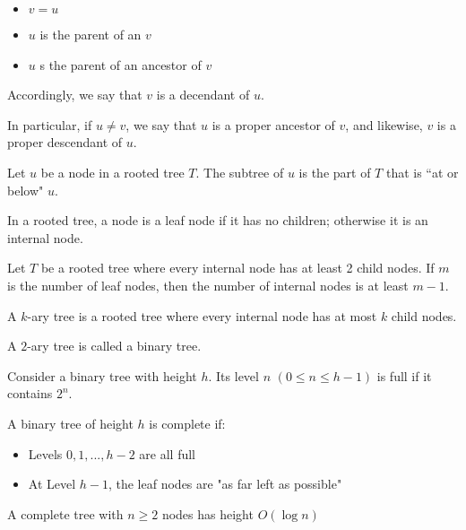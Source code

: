 \documentclass[10pt,a4paper]{article}
\begin{document}
\begin{multicols}{3}
    \begin{itemize}
        \item $v = u$
        \item $u$ is the parent of an $v$
        \item $u$ s the parent of an ancestor of $v$
    \end{itemize}

    Accordingly, we say that $v$ is a decendant of $u$.

    In particular, if $u \neq v$, we say that $u$ is a proper ancestor of $v$, and likewise, $v$ is a proper descendant of $u$.

    Let $u$ be a node in a rooted tree $T$. The subtree of $u$ is the part of $T$ that is ``at or below" $u$.

    In a rooted tree, a node is a leaf node if it has no children; otherwise it is an internal node.

    Let $T$ be a rooted tree where every internal node has at least 2 child nodes. If $m$ is the number of leaf nodes, then the number of internal nodes is at least $m-1$.

    A $k$-ary tree is a rooted tree where every internal node has at most $k$ child nodes.

    A $2$-ary tree is called a binary tree.

    Consider a binary tree with height $h$. Its level $n$ $(0 \leqslant n \leqslant h - 1)$ is full if it contains $2^n$. 

    A binary tree of height $h$ is complete if:

    \begin{itemize}
        \item Levels $0, 1, ..., h-2$ are all full
        \item At Level $h-1$, the leaf nodes are "as far left as possible"
    \end{itemize}

    A complete tree with $n \geqslant 2$ nodes has height $O(\log n)$






    
\end{multicols}
\end{document}
